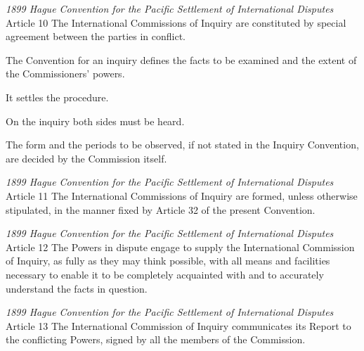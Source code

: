\begin{conventiondetails}{\textit{1899 Hague Convention for the Pacific Settlement of International Disputes} Article 10}
    \flushleft
    The International Commissions of Inquiry are constituted by special agreement between the parties in conflict.

    \vspace{\baselineskip}

    The Convention for an inquiry defines the facts to be examined and the extent of the Commissioners' powers.

    \vspace{\baselineskip}

    It settles the procedure.

    \vspace{\baselineskip}

    On the inquiry both sides must be heard.

    \vspace{\baselineskip}

    The form and the periods to be observed, if not stated in the Inquiry Convention, are decided by the Commission itself.
\end{conventiondetails}

\begin{conventiondetails}{\textit{1899 Hague Convention for the Pacific Settlement of International Disputes} Article 11}
    \flushleft
    The International Commissions of Inquiry are formed, unless otherwise stipulated, in the manner fixed by Article 32 of the present Convention.
\end{conventiondetails}

\begin{conventiondetails}{\textit{1899 Hague Convention for the Pacific Settlement of International Disputes} Article 12}
    \flushleft
    The Powers in dispute engage to supply the International Commission of Inquiry, as fully as they may think possible, with all means and facilities necessary to enable it to be completely acquainted with and to accurately understand the facts in question.
\end{conventiondetails}

\begin{conventiondetails}{\textit{1899 Hague Convention for the Pacific Settlement of International Disputes} Article 13}
    \flushleft
    The International Commission of Inquiry communicates its Report to the conflicting Powers, signed by all the members of the Commission.
\end{conventiondetails}


